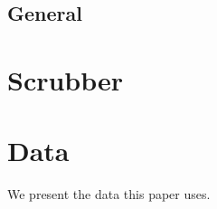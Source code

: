 \documentclass{amsart}
\theoremstyle{definition}
\theoremstyle{remark}
\begin{document}
	\subsection{General}
	\label{ss:general}
\section{Scrubber}
%
%
%
\section{Data}
\label{s:data}
	We present the data this paper uses.
%
%
%
%
%
%
\begin{bibdiv}
\label{s:references}
	\begin{biblist}
	\end{biblist}
\end{bibdiv}
%
%
%
\end{document}
